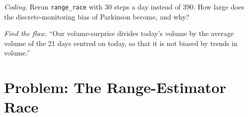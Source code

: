 \begin{exercise}[$\star\star\star$]\label{exo:rs:price-and-volume-features:7}
\emph{Coding.} Rerun \texttt{range\_race} with 30 steps a day instead of 390. How large does the discrete-monitoring bias of Parkinson
become, and why?
\end{exercise}

\begin{exercise}[$\star\star\star$]\label{exo:rs:price-and-volume-features:8}
\emph{Find the flaw.} ``Our volume-surprise  divides today's volume by the average volume of the 21 days centred on today, so
that it is not biased by trends in volume.''
\end{exercise}

\section{Problem: The Range-Estimator Race}


